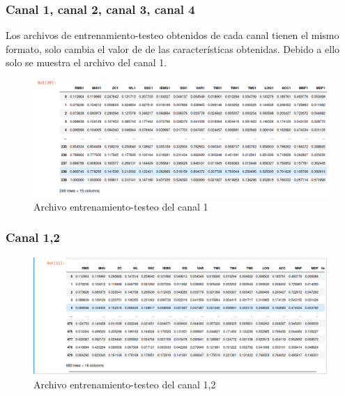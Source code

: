     \subsubsection{Canal 1, canal 2, canal 3, canal 4}
    Los archivos de entrenamiento-testeo obtenidos de cada canal tienen el mismo formato, solo cambia el valor de de las características obtenidas. Debido a ello solo se muestra el archivo del canal 1.
        \begin{figure}[!ht]
            \centering
            \includegraphics[width=1.0\textwidth]{imagenes/datos canal 1.png}
            \caption{Archivo entrenamiento-testeo del canal 1}
            \label{fig:archivo1}
        \end{figure}
   
   \newpage     
    \subsubsection{Canal 1,2}
        \begin{figure}[ht]
            \centering
            \includegraphics[width=1.0\textwidth]{imagenes/datos canal12.png}
            \caption{Archivo entrenamiento-testeo del canal 1,2}
            \label{fig:archivo12}
        \end{figure}
        
      
